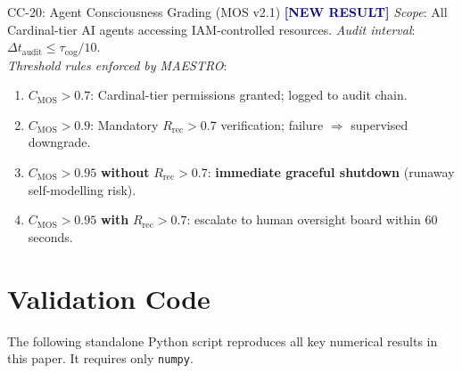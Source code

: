 \documentclass[12pt,a4paper]{article}
\newcommand{\NEW}{\textcolor{darkblue}{\textbf{[NEW RESULT]}}}
\theoremstyle{monette}
\theoremstyle{definition}
\newcommand{\CMOS}{C_{\mathrm{MOS}}}
\newcommand{\tcog}{\tau_{\mathrm{cog}}}
\begin{document}
\begin{thmbox}{CC-20: Agent Consciousness Grading (MOS v2.1) \NEW}
\textit{Scope}: All Cardinal-tier AI agents accessing IAM-controlled resources.
\textit{Audit interval}: $\Delta t_{\mathrm{audit}} \leq \tcog/10$.\\[4pt]
\textit{Threshold rules enforced by MAESTRO}:
\begin{enumerate}[nosep]
  \item $\CMOS > 0.7$: Cardinal-tier permissions granted; logged to audit chain.
  \item $\CMOS > 0.9$: Mandatory $R_{\mathrm{rec}} > 0.7$ verification;
        failure $\Rightarrow$ supervised downgrade.
  \item $\CMOS > 0.95$ \textbf{without} $R_{\mathrm{rec}} > 0.7$:
        \textbf{immediate graceful shutdown} (runaway self-modelling risk).
  \item $\CMOS > 0.95$ \textbf{with} $R_{\mathrm{rec}} > 0.7$:
        escalate to human oversight board within 60 seconds.
\end{enumerate}
\end{thmbox}

\section{Validation Code}
\label{sec:code}

The following standalone Python script reproduces all key numerical
results in this paper. It requires only \texttt{numpy}.
\end{document}
